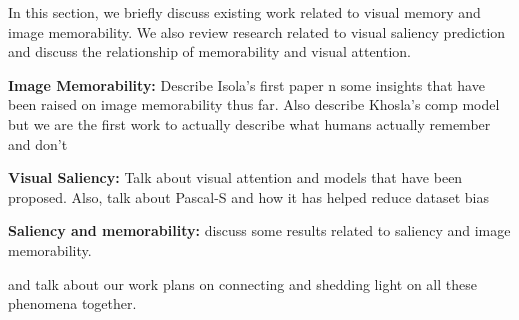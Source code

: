 In this section, we briefly discuss existing work related to visual memory and image memorability. We also review research related to visual saliency prediction and discuss the relationship of memorability and visual attention.




%

\textbf{Image Memorability: } Describe Isola's first paper n some insights that have been raised on image memorability thus far. Also describe Khosla's comp model but we are the first work to actually describe what humans actually remember and don't

\textbf{Visual Saliency: } Talk about visual attention and models that have been proposed. Also, talk about Pascal-S and how it has helped reduce dataset bias

\textbf{Saliency and memorability: } discuss some results related to saliency and image memorability.

and talk about our work plans on connecting and shedding light on all these phenomena together. 